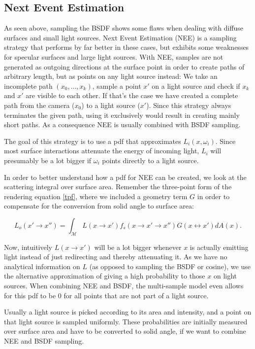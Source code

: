 \subsection{Next Event Estimation}
As seen above, sampling the BSDF shows some flaws when dealing with diffuse surfaces and small light sources. Next Event Estimation (NEE) is a sampling strategy that performs by far better in these cases, but exhibits some weaknesses for specular surfaces and large light sources.\newline
With NEE, samples are not generated as outgoing directions at the surface point in order to create paths of arbitrary length, but as points on any light source instead: We take an incomplete path $(x_0,\dots,x_k)$, sample a point $x'$ on a light source and check if $x_k$ and $x'$ are visible to each other. If that's the case we have created a complete path from the camera ($x_0$) to a light source ($x'$). Since this strategy always terminates the given path, using it exclusively would result in creating mainly short paths. As a consequence NEE is usually combined with BSDF sampling.

The goal of this strategy is to use a pdf that approximates $L_i(x,\omega_i)$. Since most surface interactions attenuate the energy of incoming light, $L_i$ will presumably be a lot bigger if $\omega_i$ points directly to a light source.

In order to better understand how a pdf for NEE can be created, we look at the scattering integral over surface area. Remember the three-point form of the rendering equation \ref{tpf}, where we included a geometry term $G$ in order to compensate for the conversion from solid angle to surface area:

\begin{equation*}
L_o(x' \rightarrow x'') = \int_\mathcal{M} L(x \rightarrow x') f_s(x \rightarrow x' \rightarrow x'') G(x\leftrightarrow x')dA(x).
\end{equation*}

Now, intuitively $L(x \rightarrow x')$ will be a lot bigger whenever $x$ is actually emitting light instead of just redirecting and thereby attenuating it. As we have no analytical information on $L$ (as opposed to sampling the BSDF or cosine), we use the alternative approximation of giving a high probability to those $x$ on light sources. When combining NEE and BSDF, the multi-sample model even allows for this pdf to be $0$ for all points that are not part of a light source.

Usually a light source is picked according to its area and intensity, and a point on that light source is sampled uniformly. These probabilities are initially measured over surface area and have to be converted to solid angle, if we want to combine NEE and BSDF sampling.\\

